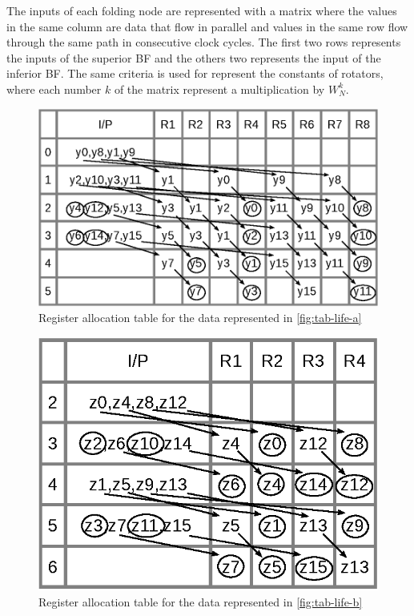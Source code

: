 \documentclass[journal,comsoc]{IEEEtran}
\begin{document}
The inputs of each folding node are represented with a matrix where the values in the same column are data that flow in parallel and values in the same row flow through the same path in consecutive clock cycles. The first two rows represents the inputs of the superior BF and the others two represents the input of the inferior BF. 
The same criteria is used for represent the constants of rotators, where each number $k$ of the matrix represent a multiplication by $W^k_N$.

\begin{figure} 
\centering
 \includegraphics[width=0.9\linewidth]{Diagramas/tab_life_a.eps}
\caption{Register allocation table for the data represented in \ref{fig:tab-life-a}}
\label{fig:tab-aloc-a}
\end{figure}

\begin{figure} 
\centering
 \includegraphics[width=0.63\linewidth]{Diagramas/tab_life_b.eps}
\caption{Register allocation table for the data represented in \ref{fig:tab-life-b}}
\label{fig:tab-aloc-b}
\end{figure}
\end{document}
